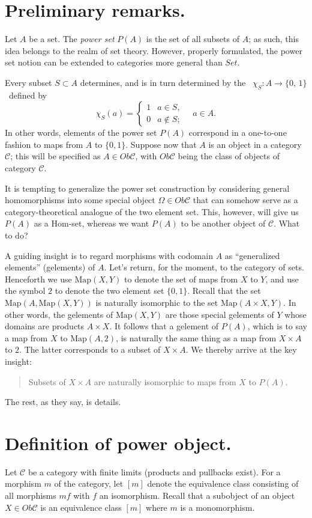 \documentclass[12pt]{article}
\newcommand{\cC}{{\mathcal{C}}}
\newcommand{\Set}{\mathit{Set}}
\newcommand{\Map}{\mathrm{Map}}
\begin{document}
\section{Preliminary remarks.}
Let $A$ be a set. The \emph{power set} $P(A)$ is the set of all subsets of
$A$; as such, this idea belongs to the realm of set theory.  However,  properly formulated, the power set notion can be extended to
categories more general than $\Set$.

Every subset $S\subset A$ determines, and is in turn determined by the \, 
$\chi_S:A \to \{0,\,1\}$\,  defined by
\[ \chi_S(a)=
\begin{cases}
  1 & a\in S,\\
  0 & a\notin S;
\end{cases}
\quad a\in A.
\]
In other words, elements of the power set $P(A)$ correspond in a
one-to-one fashion to maps from $A$ to $\{0,1\}$.  Suppose now that
$A$ is an object in a category $\cC$; this will be specified as $ A \in Ob \cC$,
with $Ob \cC$ being the class of objects of category $\cC$.  

It is tempting to generalize the power set construction by considering general homomorphisms into
some special object $\Omega \in Ob \cC$ that can somehow serve as a
category-theoretical analogue of the two element set.  This, however,
will give us $P(A)$ as a Hom-set, whereas we want $P(A)$ to be another
object of $\cC$.  What to do?

A guiding insight\cite{BW} is to regard morphisms with codomain $A$ as
``generalized elements'' (gelements) of $A$.  Let's return, for the
moment, to the category of sets. Henceforth we use $\Map(X,Y)$ to
denote the set of maps from $X$ to $Y$, and use the symbol $2$ to
denote the two element set $\{0,1\}$.  Recall that the set
$\Map(A,\Map(X,Y))$ is naturally isomorphic to the set $\Map(A\times
X,Y)$.  In other words, the gelements of $\Map(X,Y)$ are those special
gelements of $Y$ whose domains are products $A\times X$.  It follows
that a gelement of $P(A)$, which is to say a map from $X$ to
$\Map(A,2)$, is naturally the same thing as a map from $X\times A$ to
$2$. The latter corresponds to a subset of $X\times A$.  We thereby
arrive at the key insight:
\begin{quote}
  Subsets of $X\times A$ are naturally isomorphic to  maps from $X$ to
  $P(A)$.  
\end{quote}
The rest, as they say, is details.

\section{Definition of power object.}
Let $\cC$ be a category with finite limits (products and pullbacks
exist).  For a morphism $m$ of the category, let $[m]$ denote the
equivalence class consisting of all morphisms $mf$ with $f$ an
isomorphism.  Recall that a subobject of an object $X \in Ob \cC$ is an
equivalence class $[m]$ where $m$ is a monomorphism.
\end{document}
